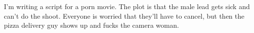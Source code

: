 \item I'm writing a script for a porn movie. The plot is that the male
  lead gets sick and can't do the shoot. Everyone is worried that
  they'll have to cancel, but then the pizza delivery guy shows up and
  fucks the camera woman.